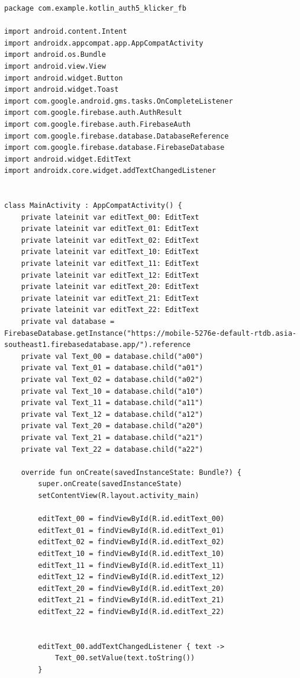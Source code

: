 \documentclass[a4paper, 14pt]{extarticle}
\begin{document}
\begin{lstlisting}[language={},caption={},label={lst:code1}]
package com.example.kotlin_auth5_klicker_fb

import android.content.Intent
import androidx.appcompat.app.AppCompatActivity
import android.os.Bundle
import android.view.View
import android.widget.Button
import android.widget.Toast
import com.google.android.gms.tasks.OnCompleteListener
import com.google.firebase.auth.AuthResult
import com.google.firebase.auth.FirebaseAuth
import com.google.firebase.database.DatabaseReference
import com.google.firebase.database.FirebaseDatabase
import android.widget.EditText
import androidx.core.widget.addTextChangedListener


class MainActivity : AppCompatActivity() {
    private lateinit var editText_00: EditText
    private lateinit var editText_01: EditText
    private lateinit var editText_02: EditText
    private lateinit var editText_10: EditText
    private lateinit var editText_11: EditText
    private lateinit var editText_12: EditText
    private lateinit var editText_20: EditText
    private lateinit var editText_21: EditText
    private lateinit var editText_22: EditText
    private val database = FirebaseDatabase.getInstance("https://mobile-5276e-default-rtdb.asia-southeast1.firebasedatabase.app/").reference
    private val Text_00 = database.child("a00")
    private val Text_01 = database.child("a01")
    private val Text_02 = database.child("a02")
    private val Text_10 = database.child("a10")
    private val Text_11 = database.child("a11")
    private val Text_12 = database.child("a12")
    private val Text_20 = database.child("a20")
    private val Text_21 = database.child("a21")
    private val Text_22 = database.child("a22")

    override fun onCreate(savedInstanceState: Bundle?) {
        super.onCreate(savedInstanceState)
        setContentView(R.layout.activity_main)

        editText_00 = findViewById(R.id.editText_00)
        editText_01 = findViewById(R.id.editText_01)
        editText_02 = findViewById(R.id.editText_02)
        editText_10 = findViewById(R.id.editText_10)
        editText_11 = findViewById(R.id.editText_11)
        editText_12 = findViewById(R.id.editText_12)
        editText_20 = findViewById(R.id.editText_20)
        editText_21 = findViewById(R.id.editText_21)
        editText_22 = findViewById(R.id.editText_22)


        editText_00.addTextChangedListener { text ->
            Text_00.setValue(text.toString())
        }


\end{lstlisting}
\end{document}
